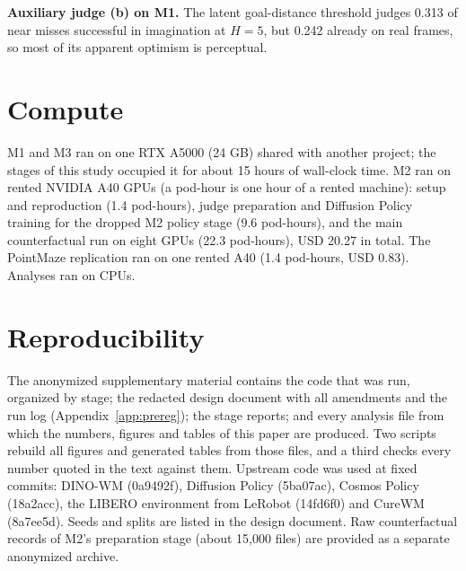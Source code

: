 \documentclass[10pt]{article}
\begin{document}
\textbf{Auxiliary judge (b) on M1.} The latent goal-distance threshold judges 0.313 of near misses successful in imagination at $H=5$, but 0.242 already on real frames, so most of its apparent optimism is perceptual.

\section{Compute}
\label{app:compute}

M1 and M3 ran on one RTX A5000 (24 GB) shared with another project; the stages of this study occupied it for about 15 hours of wall-clock time. M2 ran on rented NVIDIA A40 GPUs (a pod-hour is one hour of a rented machine): setup and reproduction (1.4 pod-hours), judge preparation and Diffusion Policy training for the dropped M2 policy stage (9.6 pod-hours), and the main counterfactual run on eight GPUs (22.3 pod-hours), USD 20.27 in total. The PointMaze replication ran on one rented A40 (1.4 pod-hours, USD 0.83). Analyses ran on CPUs.

\section{Reproducibility}
\label{app:repro}

The anonymized supplementary material contains the code that was run, organized by stage; the redacted design document with all amendments and the run log (Appendix~\ref{app:prereg}); the stage reports; and every analysis file from which the numbers, figures and tables of this paper are produced. Two scripts rebuild all figures and generated tables from those files, and a third checks every number quoted in the text against them. Upstream code was used at fixed commits: DINO-WM (0a9492f), Diffusion Policy (5ba07ac), Cosmos Policy (18a2acc), the LIBERO environment from LeRobot \citep{cadene2026lerobot} (14fd6f0) and CureWM (8a7ee5d). Seeds and splits are listed in the design document. Raw counterfactual records of M2's preparation stage (about 15,000 files) are provided as a separate anonymized archive.
\end{document}

